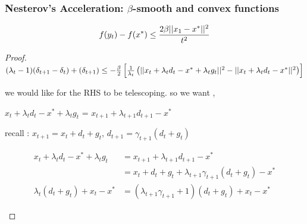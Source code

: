 








\begin{frame}\frametitle{ Nesterov’s Acceleration: $\beta$-smooth and convex functions}
\begin{spacing}{0.5}   

$$f(y_t)-f(x^*) \leq {2\beta ||x_1-x^*||^2 \over t^2}$$
\end{spacing}
\begin{proof}



$(\lambda_t - 1)(\delta_{t+1} - \delta_{t}) + (\delta_{t+1}) \leq -{\beta \over 2}\left[{1 \over \lambda_t}\left(||x_t+\lambda_t d_t-x^*+\lambda_t g_t||^2-||x_t+\lambda_t d_t - x^*||^2\right)\right]$

\begin{center}
    we would like for the RHS to be telescoping. so we want , 

    $x_t+\lambda_t d_t - x^*+\lambda_t g_t$ = $x_{t+1}+\lambda_{t+1}d_{t+1}-x^*$

    recall : $x_{t+1}=x_t+d_t+g_t$, $d_{t+1} = \gamma_{t+1}(d_t+g_t)$
\end{center}

\begin{spacing}{0.5}
\begin{align*}
x_t+\lambda_t d_t - x^*+\lambda_t g_t &= x_{t+1}+\lambda_{t+1}d_{t+1}-x^*\\
&=x_t+d_t+g_t+\lambda_{t+1}\gamma_{t+1}(d_t+g_t)-x^*\\
\lambda_t(d_t+g_t)+x_t-x^* &= (\lambda_{t+1}\gamma_{t+1}+1)(d_t+g_t)+x_t-x^*
\end{align*}
\end{spacing}


\end{proof}

\end{frame}

